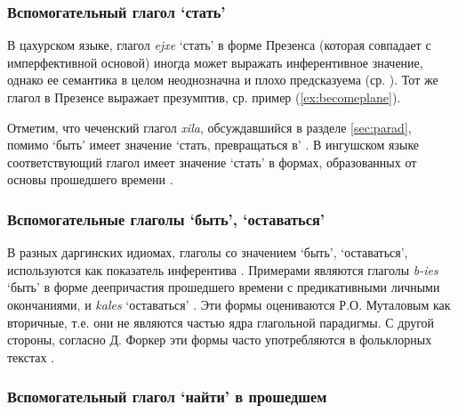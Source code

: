 \subsubsection{Вспомогательный глагол `стать'} \label{sec:become}

В цахурском языке, глагол \textit{ejxe} `стать' в форме Презенса (которая совпадает с имперфективной основой) иногда может выражать инферентивное значение, однако ее семантика в целом неоднозначна и плохо предсказуема (ср. \citep[291--292]{tatevosovmaisak1999admir}). Тот же глагол в Презенсе выражает презумптив, ср. пример (\ref{ex:becomeplane}).


Отметим, что чеченский глагол \textit{xila}, обсуждавшийся в разделе \ref{sec:parad}, помимо `быть' имеет значение `стать, превращаться в' \citep[133]{molochieva2010}. В ингушском языке соответствующий глагол имеет значение `стать' в формах, образованных от основы прошедшего времени \citep[326]{nichols2011}.

\subsubsection{Вспомогательные глаголы `быть', `оставаться'} \label{sec:stay}

В разных даргинских идиомах, глаголы со значением `быть', `оставаться', используются как показатель инферентива \citep[500--502]{forker2018evid}. Примерами являются глаголы \textit{b-ies} `быть' в форме деепричастия прошедшего времени с предикативными личными окончаниями, и \textit{kales} `оставаться' \citep[147--152]{mutalov2002}. Эти формы оцениваются Р.О. Муталовым как вторичные, т.е. они не являются частью ядра глагольной парадигмы. С другой стороны, согласно Д. Форкер эти формы часто употребляются в фольклорных текстах \citep[500]{forker2018evid}.

\subsubsection{Вспомогательный глагол `найти' в прошедшем} \label{sec:findpast}

